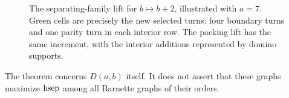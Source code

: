 \begin{figure}[htbp]
\caption{The separating-family lift for \(b\mapsto b+2\), illustrated with
\(a=7\).  Green cells are precisely the new selected turns: four boundary
turns and one parity turn in each interior row.  The packing lift has the same
increment, with the interior additions represented by domino supports.}
\label{fig:family-lift}
\end{figure}

The theorem concerns \(D(a,b)\) itself.  It does not assert that these graphs
maximize \(\operatorname{hsep}\) among all Barnette graphs of their orders.
